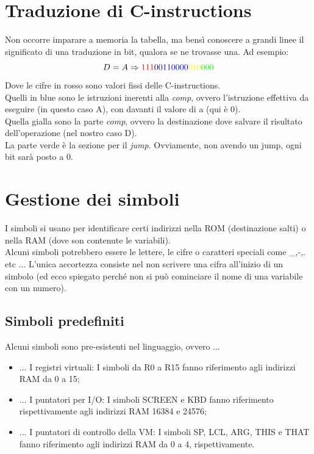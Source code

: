 \documentclass[12pt]{article}
\begin{document}
\section{Traduzione di C-instructions}
\label{sec:c_instructions_translation_details}
Non occorre imparare a memoria la tabella, ma bensì conoscere a grandi linee il significato di una traduzione in bit, qualora se ne trovasse una. Ad esempio:
\[ D=A \Rightarrow \textcolor{red}{111}0\textcolor{blue}{0110000}\textcolor{yellow}{010}\textcolor{green}{000} \]
Dove le cifre in rosso sono valori fissi delle C-instructions.
\\
Quelli in blue sono le istruzioni inerenti alla \textit{comp}, ovvero l'istruzione effettiva da eseguire (in questo caso A), con davanti il valore di a (qui è 0).
\\
Quella gialla sono la parte \textit{comp}, ovvero la destinazione dove salvare il risultato dell'operazione (nel nostro caso D).
\\
La parte verde è la sezione per il \textit{jump}. Ovviamente, non avendo un jump, ogni bit sarà posto a 0.

\section{Gestione dei simboli}
\label{sec:gestione_simboli}
I simboli si usano per identificare certi indirizzi nella ROM (destinazione salti) o nella RAM (dove son contenute le variabili).
\\
Alcuni simboli potrebbero essere le lettere, le cifre o caratteri speciali come \_,-,. etc $\dots$
L'unica accortezza consiste nel non scrivere una cifra all'inizio di un simbolo (ed ecco spiegato perché non si può cominciare il nome di una variabile con un numero).

\subsection{Simboli predefiniti}
\label{ssec:simboli_predef}
Alcuni simboli sono pre-esistenti nel linguaggio, ovvero $\dots$
\begin{itemize}
    \item $\dots$ I registri virtuali: I simboli da R0 a R15 fanno riferimento agli indirizzi RAM da 0 a 15;
    \item $\dots$ I puntatori per I/O: I simboli SCREEN e KBD fanno riferimento rispettivamente agli indirizzi RAM 16384 e 24576;
    \item $\dots$ I puntatori di controllo della VM: I simboli SP, LCL, ARG, THIS e THAT fanno riferimento agli indirizzi RAM da 0 a 4, rispettivamente.
\end{itemize}
\end{document}
